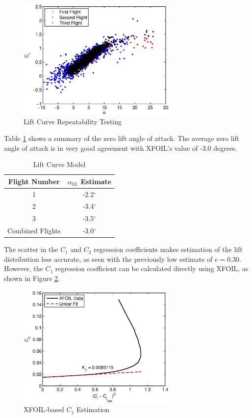 \begin{figure}[H]
  \centering
    \includegraphics[width=0.7\textwidth]{figures/CLalphaRepeatClean.eps}
      \caption{Lift Curve Repeatability Testing} \label{fig:CLalphaRepeatClean}
\end{figure}

Table \ref{table:liftCurveModel} shows a summary of the zero lift angle of attack. The average zero lift angle of attack is in very good agreement with XFOIL's value of -3.0 degrees.
\begin{table}[H]
\caption{Lift Curve Model}
\label{table:liftCurveModel}
\centering
\begin{tabular}{c c}
\hline\hline
 Flight Number & $\alpha_{0L}$ Estimate \\
 \hline
1 & -2.2$^\circ$\\
2 & -3.4$^\circ$\\
3 & -3.5$^\circ$\\
\hline \hline
Combined Flights & -3.0$^\circ$\\
\hline
\end{tabular}
\end{table}

The scatter in the  $C_1$ and $C_2$ regression coefficients makes estimation of the lift distribution less accurate, as seen with the previously low estimate of $e=0.30$. However, the $C_1$ regression coefficient can be calculated directly using XFOIL, as shown in Figure \ref{fig:clarkYXfoil}. 
\begin{figure}[H]
	\centering
	\includegraphics[width=0.7\textwidth]{figures/clarkYXfoil.eps} \caption{XFOIL-based $C_1$ Estimation} \label{fig:clarkYXfoil}
\end{figure}

